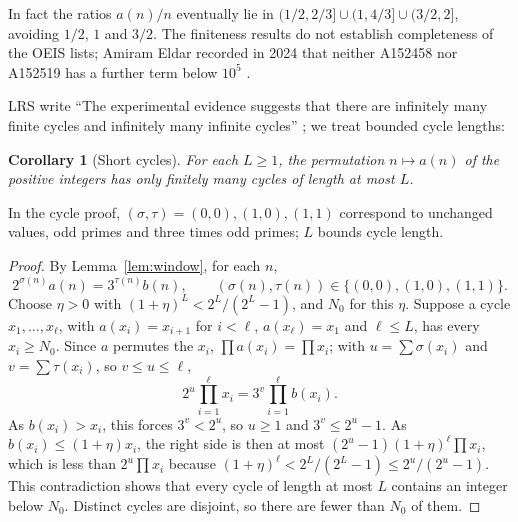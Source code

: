 \documentclass[11pt]{article}
\newtheorem{corollary}[theorem]{Corollary}
\theoremstyle{remark}
\begin{document}
In fact the ratios $a(n)/n$ eventually lie in
$(1/2,2/3]\cup(1,4/3]\cup(3/2,2]$, avoiding $1/2$, $1$ and $3/2$.
The finiteness results do not establish completeness of the OEIS lists;
Amiram Eldar recorded in 2024 that neither A152458 nor A152519 has a
further term below $10^5$ \cite[A152458 and A152519, Eldar comments, 2024]{oeis}.

LRS write ``The experimental evidence suggests that there are infinitely many finite cycles and infinitely many
infinite cycles'' \cite[Section~7]{lrs}; we treat bounded cycle lengths:

\begin{corollary}[Short cycles]\label{cor:cycles}
For each $L\geq1$, the permutation $n\mapsto a(n)$ of the positive
integers has only finitely many cycles of length at most $L$.
\end{corollary}
In the cycle proof, $(\sigma,\tau)=(0,0),(1,0),(1,1)$ correspond to
unchanged values, odd primes and three times odd primes; $L$ bounds cycle length.

\begin{proof}
By Lemma~\ref{lem:window}, for each $n$,
\[
 2^{\sigma(n)}a(n)=3^{\tau(n)}b(n),\qquad
 (\sigma(n),\tau(n))\in\{(0,0),(1,0),(1,1)\}.
\]
Choose $\eta>0$ with
$(1+\eta)^L<2^L/(2^L-1)$, and $N_0$ for this $\eta$. Suppose a cycle
$x_1,\ldots,x_\ell$, with $a(x_i)=x_{i+1}$ for $i<\ell$,
$a(x_\ell)=x_1$ and $\ell\leq L$, has every $x_i\geq N_0$. Since $a$ permutes the $x_i$,
$\prod a(x_i)=\prod x_i$; with $u=\sum\sigma(x_i)$ and
$v=\sum\tau(x_i)$, so $v\leq u\leq\ell$,
\[
 2^u\prod_{i=1}^{\ell}x_i=3^v\prod_{i=1}^{\ell}b(x_i).
\]
As $b(x_i)>x_i$, this forces $3^v<2^u$, so $u\geq1$ and
$3^v\leq2^u-1$. As $b(x_i)\leq(1+\eta)x_i$, the right side is then at
most $(2^u-1)(1+\eta)^{\ell}\prod x_i$, which is less than
$2^u\prod x_i$ because
$(1+\eta)^\ell<2^L/(2^L-1)\leq2^u/(2^u-1)$. This contradiction shows
that every cycle of length at most $L$ contains an integer below
$N_0$. Distinct cycles are disjoint, so there are fewer than $N_0$ of them.
\end{proof}
\end{document}
